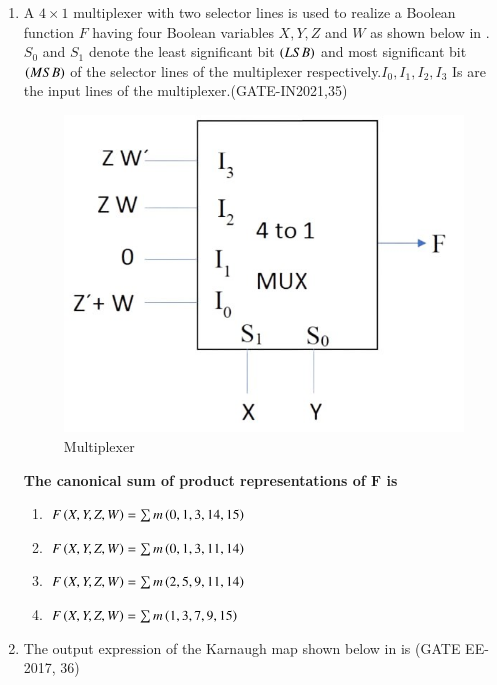 \begin{enumerate}[label=\arabic*.,ref=\theenumi]
\item A $ 4\times1$ multiplexer with two selector lines is used to realize a Boolean function $F$ having four Boolean variables $X, Y, Z$ and $W$ as shown below
in  .
	 $S_0$ and $S_1$ denote the least significant bit $\left(LSB\right)$ and most significant bit $\left(MSB\right)$ of the selector lines of the multiplexer respectively.$I_0, I_1, I_2,I_3$ Is are the input lines of the multiplexer.\hfill(GATE-IN2021,35)
  \begin{figure}[H]
  \centering
  \includegraphics[width=0.75\columnwidth]{figs/kmapsmall.jpg}
  \caption{Multiplexer}
  \label{fig:multiplexerwithtwoselectionliness}
\end{figure}
\textbf{The canonical sum of product representations of $\textbf{F}$ is} 
 \begin{enumerate}
        \item  $F\left(X,Y,Z,W\right) = \sum m \left(0,1,3,14,15\right)$
        \item  $F\left(X,Y,Z,W\right) = \sum m \left(0,1,3,11,14\right)$
        \item  $F\left(X,Y,Z,W\right) = \sum m \left(2,5,9,11,14\right)$
        \item  $F\left(X,Y,Z,W\right) = \sum m \left(1,3,7,9,15\right)$
    \end{enumerate}

\item The output expression of the Karnaugh map shown below in
is
				\hfill(GATE EE-2017, 36)


\end{enumerate}

